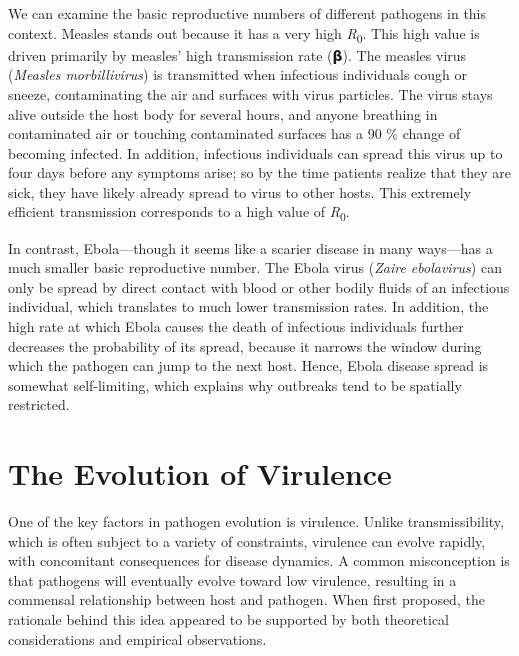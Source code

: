 \documentclass[
]{book}
\begin{document}
We can examine the basic reproductive numbers of different pathogens in this context. Measles stands out because it has a very high \emph{R}\textsubscript{0}. This high value is driven primarily by measles' high transmission rate (𝝱). The measles virus (\emph{Measles morbillivirus}) is transmitted when infectious individuals cough or sneeze, contaminating the air and surfaces with virus particles. The virus stays alive outside the host body for several hours, and anyone breathing in contaminated air or touching contaminated surfaces has a 90 \% change of becoming infected. In addition, infectious individuals can spread this virus up to four days before any symptoms arise; so by the time patients realize that they are sick, they have likely already spread to virus to other hosts. This extremely efficient transmission corresponds to a high value of \emph{R}\textsubscript{0}.

In contrast, Ebola---though it seems like a scarier disease in many ways---has a much smaller basic reproductive number. The Ebola virus (\emph{Zaire ebolavirus}) can only be spread by direct contact with blood or other bodily fluids of an infectious individual, which translates to much lower transmission rates. In addition, the high rate at which Ebola causes the death of infectious individuals further decreases the probability of its spread, because it narrows the window during which the pathogen can jump to the next host. Hence, Ebola disease spread is somewhat self-limiting, which explains why outbreaks tend to be spatially restricted.

\hypertarget{the-evolution-of-virulence}{%
\section{The Evolution of Virulence}\label{the-evolution-of-virulence}}

One of the key factors in pathogen evolution is virulence. Unlike transmissibility, which is often subject to a variety of constraints, virulence can evolve rapidly, with concomitant consequences for disease dynamics. A common misconception is that pathogens will eventually evolve toward low virulence, resulting in a commensal relationship between host and pathogen. When first proposed, the rationale behind this idea appeared to be supported by both theoretical considerations and empirical observations.
\end{document}
